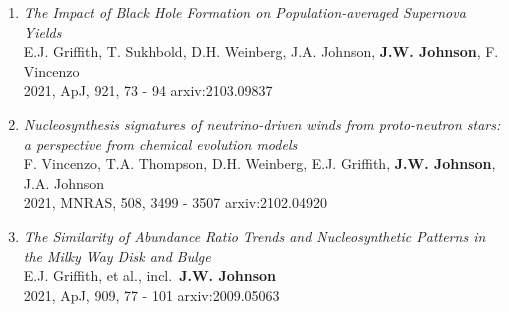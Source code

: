 \documentclass[cv.tex]{subfiles}
\begin{document}
\begin{enumerate}
	\item \textit{The Impact of Black Hole Formation on Population-averaged
	Supernova Yields}
	\\
	E.J. Griffith, T. Sukhbold, D.H. Weinberg, J.A. Johnson,
	\textbf{J.W. Johnson}, F. Vincenzo
	\\
	2021, ApJ, 921, 73 - 94 \hfill arxiv:2103.09837

	\item \textit{Nucleosynthesis signatures of neutrino-driven winds from
	proto-neutron stars: a perspective from chemical evolution models}
	\\
	F. Vincenzo, T.A. Thompson, D.H. Weinberg, E.J. Griffith,
	\textbf{J.W. Johnson}, J.A. Johnson
	\\
	2021, MNRAS, 508, 3499 - 3507 \hfill arxiv:2102.04920

	\item \textit{The Similarity of Abundance Ratio Trends and Nucleosynthetic
	Patterns in the Milky Way Disk and Bulge}
	\\
	E.J. Griffith, et al., incl.~\textbf{J.W. Johnson}
	\\
	2021, ApJ, 909, 77 - 101 \hfill arxiv:2009.05063

\end{enumerate}
\end{document}
